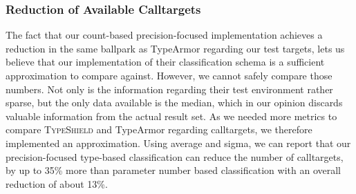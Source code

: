\subsubsection{Reduction of Available Calltargets}
The fact that our count-based precision-focused implementation achieves a reduction in the same ballpark as TypeArmor regarding our test targets, 
lets us believe that our implementation of their classification schema is a sufficient approximation to compare against. However, we cannot safely
compare those numbers. Not only is the information regarding their test environment rather sparse, but the only data available is the median, 
which in our opinion discards valuable information from the actual result set. As we needed more metrics to compare \textsc{TypeShield} and
TypeArmor regarding calltargets, we therefore implemented an approximation. Using average and sigma, we can report that our precision-focused
type-based classification can reduce the number of calltargets, by up to 35\% more than parameter number based classification with an overall
reduction of about 13\%.


